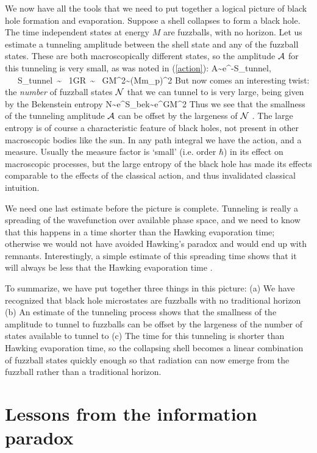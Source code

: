 \documentclass[12pt]{article}
\begin{document}
We now have all the  tools that we need to put together a logical picture of black hole formation and evaporation. Suppose a shell collapses to form a black hole. The time independent states at energy $M$ are fuzzballs, with no horizon. Let us estimate a tunneling amplitude between the shell state and any of the fuzzball states. These are both macroscopically different states, so the amplitude ${\cal A}$ for this tunneling is very small, as was noted in (\ref{action}):
\be
{\cal A}\sim  e^{-S_{tunnel}}, ~~~S_{tunnel}~\sim~ {1\pi G}\int R~\sim~ GM^2\sim ({M\over m_p})^2
 \label{actionq}
\ee
But now comes an interesting twist: the {\it number} of fuzzball states  ${\cal N}$ that we can tunnel to is very large, being given by the Bekenstein entropy
\be
{\cal N}\sim e^{S_{bek}}\sim e^{GM^2}
\ee
Thus we see that the smallness of the tunneling amplitude ${\cal A}$  can be offset by the largeness of ${\cal N}$ \cite{offset}. The large entropy is of course a characteristic feature of black holes, not present in other macroscopic bodies like the sun. In any path integral we have the action, and a measure. Usually the measure factor is `small' (i.e. order $\hbar$) in its effect on macroscopic processes, but the large entropy of the black hole has made its effects comparable to the effects of the classical action, and thus invalidated classical intuition. 

We need one last estimate before the picture is complete. Tunneling is really a spreading of the wavefunction over available phase space, and we need to know that this happens in a time shorter than the Hawking evaporation time; otherwise we would not have avoided Hawking's paradox and would end up with remnants. Interestingly, a simple estimate of this spreading time shows that it will always be less that the Hawking evaporation time \cite{release}. 


To summarize, we have put together three things in this picture: (a) We have recognized that black hole microstates are fuzzballs with no traditional horizon (b) An estimate of the tunneling process shows that the smallness of the amplitude to tunnel to fuzzballs can be offset by the largeness of the number of states available to tunnel to (c) The time for this tunneling is shorter than Hawking evaporation time, so the collapsing shell becomes a linear combination of fuzzball states quickly enough so that radiation can now emerge from the fuzzball rather than a traditional horizon. 


\section{Lessons from the information paradox}
\end{document}
